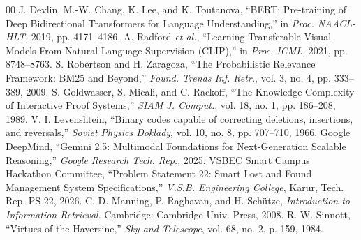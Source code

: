 \documentclass[conference]{IEEEtran}
\begin{document}
\begin{thebibliography}{00}
\footnotesize
{} J. Devlin, M.-W. Chang, K. Lee, and K. Toutanova, ``BERT: Pre-training of Deep Bidirectional Transformers for Language Understanding,'' in \textit{Proc. NAACL-HLT}, 2019, pp. 4171--4186.
 A. Radford \textit{et al.}, ``Learning Transferable Visual Models From Natural Language Supervision (CLIP),'' in \textit{Proc. ICML}, 2021, pp. 8748--8763.
 S. Robertson and H. Zaragoza, ``The Probabilistic Relevance Framework: BM25 and Beyond,'' \textit{Found. Trends Inf. Retr.}, vol. 3, no. 4, pp. 333--389, 2009.
 S. Goldwasser, S. Micali, and C. Rackoff, ``The Knowledge Complexity of Interactive Proof Systems,'' \textit{SIAM J. Comput.}, vol. 18, no. 1, pp. 186--208, 1989.
 V. I. Levenshtein, ``Binary codes capable of correcting deletions, insertions, and reversals,'' \textit{Soviet Physics Doklady}, vol. 10, no. 8, pp. 707--710, 1966.
 Google DeepMind, ``Gemini 2.5: Multimodal Foundations for Next-Generation Scalable Reasoning,'' \textit{Google Research Tech. Rep.}, 2025.
 VSBEC Smart Campus Hackathon Committee, ``Problem Statement 22: Smart Lost and Found Management System Specifications,'' \textit{V.S.B. Engineering College}, Karur, Tech. Rep. PS-22, 2026.
 C. D. Manning, P. Raghavan, and H. Sch\"{u}tze, \textit{Introduction to Information Retrieval}. Cambridge: Cambridge Univ. Press, 2008.
 R. W. Sinnott, ``Virtues of the Haversine,'' \textit{Sky and Telescope}, vol. 68, no. 2, p. 159, 1984.
\end{thebibliography}
\end{document}
